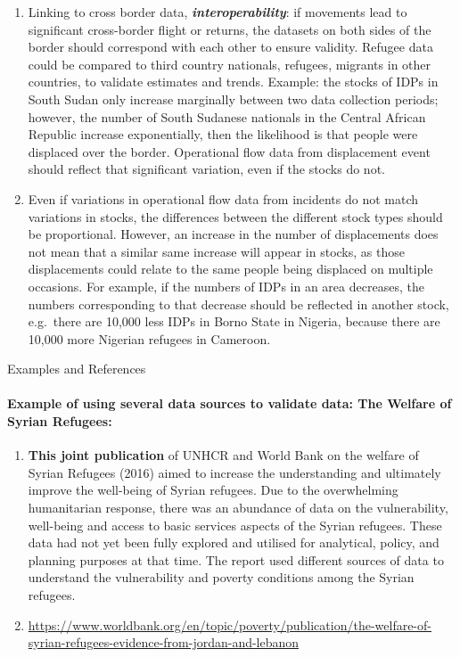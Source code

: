 \documentclass[
]{article}
\begin{document}
\begin{enumerate}
\item
  Linking to cross border data, \textbf{\emph{interoperability}}: if movements
  lead to significant cross-border flight or returns, the datasets on
  both sides of the border should correspond with each other to ensure
  validity. Refugee data could be compared to third country nationals,
  refugees, migrants in other countries, to validate estimates and
  trends. Example: the stocks of IDPs in South Sudan only increase
  marginally between two data collection periods; however, the number
  of South Sudanese nationals in the Central African Republic increase
  exponentially, then the likelihood is that people were displaced
  over the border. Operational flow data from displacement event
  should reflect that significant variation, even if the stocks do
  not.
\item
  Even if variations in operational flow data from incidents do not
  match variations in stocks, the differences between the different
  stock types should be proportional. However, an increase in the
  number of displacements does not mean that a similar same increase
  will appear in stocks, as those displacements could relate to the
  same people being displaced on multiple occasions. For example, if
  the numbers of IDPs in an area decreases, the numbers corresponding
  to that decrease should be reflected in another stock, e.g.~there
  are 10,000 less IDPs in Borno State in Nigeria, because there are
  10,000 more Nigerian refugees in Cameroon.
\end{enumerate}

Examples and References

\hypertarget{example-of-using-several-data-sources-to-validate-data-the-welfare-of-syrian-refugees}{%
\paragraph{Example of using several data sources to validate data: The Welfare of Syrian Refugees:}\label{example-of-using-several-data-sources-to-validate-data-the-welfare-of-syrian-refugees}}

\begin{enumerate}
\def\labelenumi{\arabic{enumi}.}
\setcounter{enumi}{470}
\item
  \textbf{This joint publication} of UNHCR and World Bank on the welfare
  of Syrian Refugees (2016) aimed to increase the understanding and
  ultimately improve the well-being of Syrian refugees. Due to the
  overwhelming humanitarian response, there was an abundance of data
  on the vulnerability, well-being and access to basic services
  aspects of the Syrian refugees. These data had not yet been fully
  explored and utilised for analytical, policy, and planning purposes
  at that time. The report used different sources of data to
  understand the vulnerability and poverty conditions among the Syrian
  refugees.
\item
  \url{https://www.worldbank.org/en/topic/poverty/publication/the-welfare-of-syrian-refugees-evidence-from-jordan-and-lebanon}
\end{enumerate}
\end{document}
